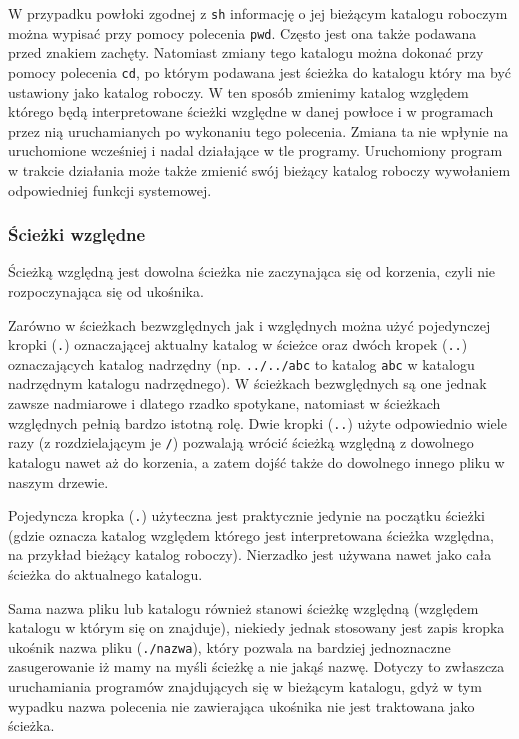 W przypadku powłoki zgodnej z \Verb$sh$ informację o jej bieżącym katalogu roboczym można wypisać przy pomocy polecenia \Verb$pwd$. Często jest ona także podawana przed znakiem zachęty. Natomiast zmiany tego katalogu można dokonać przy pomocy polecenia \Verb$cd$, po którym podawana jest ścieżka do katalogu który ma być ustawiony jako katalog roboczy. W ten sposób zmienimy katalog względem którego będą interpretowane ścieżki względne w danej powłoce i w programach przez nią uruchamianych po wykonaniu tego polecenia. Zmiana ta nie wpłynie na uruchomione wcześniej i nadal działające w tle programy. Uruchomiony program w trakcie działania może także zmienić swój bieżący katalog roboczy wywołaniem odpowiedniej funkcji systemowej.


\subsubsection{Ścieżki względne}
Ścieżką względną jest dowolna ścieżka nie zaczynająca się od korzenia, czyli nie rozpoczynająca się od ukośnika.

Zarówno w ścieżkach bezwzględnych jak i względnych można użyć pojedynczej kropki (\Verb$.$) oznaczającej aktualny katalog w ścieżce oraz dwóch kropek (\Verb$..$) oznaczających katalog nadrzędny (np. \Verb$../../abc$ to katalog \Verb$abc$ w katalogu nadrzędnym katalogu nadrzędnego). W ścieżkach bezwględnych są one jednak zawsze nadmiarowe i dlatego rzadko spotykane, natomiast w ścieżkach względnych pełnią bardzo istotną rolę. Dwie kropki (\Verb$..$) użyte odpowiednio wiele razy (z rozdzielającym je \Verb$/$) pozwalają wrócić ścieżką względną z dowolnego katalogu nawet aż do korzenia, a zatem dojść także do dowolnego innego pliku w naszym drzewie.

Pojedyncza kropka (\Verb$.$) użyteczna jest praktycznie jedynie na początku ścieżki (gdzie oznacza katalog względem którego jest interpretowana ścieżka względna, na przykład bieżący katalog roboczy). Nierzadko jest używana nawet jako cała ścieżka do aktualnego katalogu.

Sama nazwa pliku lub katalogu również stanowi ścieżkę względną (względem katalogu w którym się on znajduje), niekiedy jednak stosowany jest zapis kropka ukośnik nazwa pliku (\Verb$./nazwa$), który pozwala na bardziej jednoznaczne zasugerowanie iż mamy na myśli ścieżkę a nie jakąś nazwę. Dotyczy to zwłaszcza uruchamiania programów znajdujących się w bieżącym katalogu, gdyż w tym wypadku nazwa polecenia nie zawierająca ukośnika nie jest traktowana jako ścieżka.


